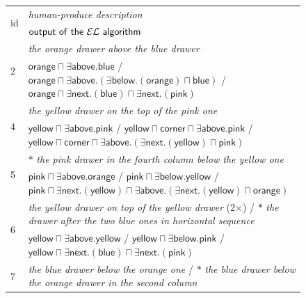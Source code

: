 \begin{figure}[thb]

\begin{footnotesize}
\begin{tabular}{|l|p{}|}\hline
\multirow{2}{*}{id} & \textit{human-produce description} \\
& $\mathsf{output\ of\ the\ \el\ algorithm}$\\\hline
\multirow{2}{*}{2} & \textit{the orange drawer above the blue drawer} \\
&  $\bm{\mathsf{orange} \sqcap \exists \mathsf{above}.\mathsf{blue}}$ / $\mathsf{orange} \sqcap \exists \mathsf{above}.(\exists \mathsf{below}.(\mathsf{orange}) \sqcap \mathsf{blue})$ / $ \mathsf{orange} \sqcap \exists \mathsf{next}.(\mathsf{blue}) \sqcap \exists \mathsf{next}.(\mathsf{pink})$\\\hline
\multirow{2}{*}{4} & \textit{the yellow drawer on the top of the pink one} \\ 
&  $\bm{\mathsf{yellow} \sqcap \exists \mathsf{above}.\mathsf{pink}}$  / $\mathsf{yellow}  \sqcap \mathsf{corner} \sqcap \exists \mathsf{above}.\mathsf{pink}$  / $\mathsf{yellow} \sqcap \mathsf{corner} \sqcap \exists \mathsf{above}.(\exists \mathsf{next}.(\mathsf{yellow}) \sqcap \mathsf{pink})$\\\hline
\multirow{2}{*}{5} & $\ast$ \textit{the pink drawer in the fourth column below the yellow one}\\
&  $\mathsf{pink} \sqcap \exists \mathsf{above}.\mathsf{orange}$  / $\mathsf{pink} \sqcap \exists \mathsf{below}.\mathsf{yellow}$  / $ \mathsf{pink} \sqcap \exists \mathsf{next}.(\mathsf{yellow}) \sqcap \exists \mathsf{above}.(\exists \mathsf{next}.(\mathsf{yellow}) \sqcap \mathsf{orange})$\\\hline
\multirow{2}{*}{6} & \textit{the yellow drawer on top of the yellow drawer} (2$\times$) / $\ast$ \textit{the drawer after the two blue ones in horizontal sequence}\\
&  $\bm{\mathsf{yellow} \sqcap \exists \mathsf{above}.\mathsf{yellow}}$  / $\mathsf{yellow} \sqcap \exists \mathsf{below}.\mathsf{pink}$  / $\mathsf{yellow} \sqcap \exists \mathsf{next}.(\mathsf{blue}) \sqcap \exists \mathsf{next}.(\mathsf{pink})$\\\hline
\multirow{2}{*}{7} & \textit{the blue drawer below the orange one} / $\ast$ \textit{the blue drawer below the orange drawer in the second column}\\ 

\end{tabular}
\end{footnotesize}
\end{figure}
